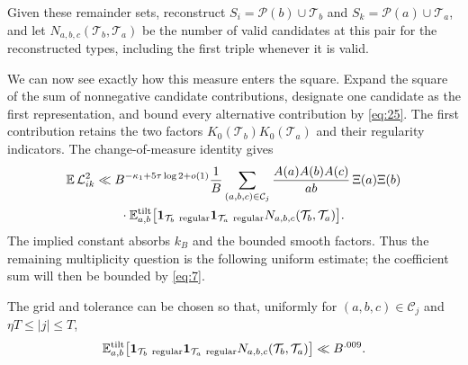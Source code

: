 Given these remainder sets, reconstruct
$S_i=\mathcal P(b)\cup\mathcal T_b$ and
$S_k=\mathcal P(a)\cup\mathcal T_a$, and let
$N_{a,b,c}(\mathcal T_b,\mathcal T_a)$ be the number of valid candidates
at this pair for the reconstructed types, including the first triple
whenever it is valid.

We can now see exactly how this measure enters the square.
Expand the square of the sum of nonnegative candidate contributions,
designate one candidate as the first representation, and bound every
alternative contribution by \eqref{eq:25}. The first contribution retains
the two factors $K_0(\mathcal T_b)K_0(\mathcal T_a)$ and their regularity
indicators. The change-of-measure identity gives
\begin{equation}
\begin{split}
 \mathbb E\,\mathcal L_{ik}^{2}
 &\ll B^{-\kappa_1+5\tau\log2+o(1)}
 \frac1B\sum_{(a,b,c)\in\mathcal C_j}
       \frac{A(a)A(b)A(c)}{ab}\,\Xi(a)\Xi(b)\\
 &\qquad\cdot
 \mathbb E^{\mathrm{tilt}}_{a,b}
 \big[
   \mathbf 1_{\mathcal T_b\ \mathrm{regular}}
   \mathbf 1_{\mathcal T_a\ \mathrm{regular}}
   N_{a,b,c}(\mathcal T_b,\mathcal T_a)
 \big].
\end{split}
\label{eq:moments-first-representation}
\end{equation}
The implied constant absorbs $k_B$ and the bounded smooth factors.
Thus the remaining multiplicity question is the following uniform
estimate; the coefficient sum will then be bounded by \eqref{eq:7}.

\begin{lemma}
\label{lem:moments:multiplicity}
The grid and tolerance can be chosen so that, uniformly for
$(a,b,c)\in\mathcal C_j$ and $\eta T\le |j|\le T$,
\[
 \mathbb E^{\mathrm{tilt}}_{a,b}
   \big[
    \mathbf 1_{\mathcal T_b\ \mathrm{regular}}
    \mathbf 1_{\mathcal T_a\ \mathrm{regular}}
    N_{a,b,c}(\mathcal T_b,\mathcal T_a)
   \big]
 \ll B^{.009}.
\]
\end{lemma}

